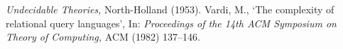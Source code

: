 \documentclass[draft]{article}
\begin{document}
\begin{thebibliography}{}
\emph{Undecidable Theories,}\/
North-Holland (1953).
%
%
{\sc Vardi,} M.,
`The complexity of relational query languages',
In: {\it Proceedings of the 14th ACM Symposium on Theory of Computing,}\/
ACM (1982) 137--146.
%
%
%
%
%
%
%
%
\end{thebibliography}
%
%
%
%
\end{document}

